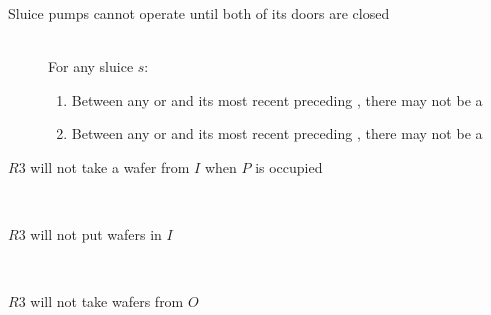 \begin{description}
 \item[Sluice pumps cannot operate until both of its doors are closed] \hfill \\
 For any sluice $s$:
 \begin{enumerate}
  \item Between any  or  and its most recent preceding , there may not be a 
  \item Between any  or  and its most recent preceding , there may not be a 
 \end{enumerate}

 \item[$R3$ will not take a wafer from $I$ when $P$ is occupied] \hfill \\
 
 \item[$R3$ will not put wafers in $I$] \hfill \\
 
 \item[$R3$ will not take wafers from $O$] \hfill \\
 
\end{description}
